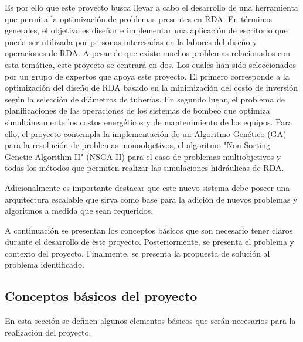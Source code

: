 \documentclass[11pt,letterpaper]{article}
\begin{document}
Es por ello que este proyecto busca llevar a cabo el desarrollo de una herramienta que permita la optimización de problemas presentes en RDA. En términos generales, el objetivo es diseñar e implementar una aplicación de escritorio que pueda ser utilizada por personas interesadas en la labores del diseño y operaciones de RDA. A pesar de que existe muchos problemas relacionados con esta temática, este proyecto se centrará en dos. Los cuales han sido seleccionados por un grupo de expertos que apoya este proyecto. El primero corresponde a la optimización del diseño de RDA basado en la minimización del costo de inversión según la selección de diámetros de tuberías. En segundo lugar, el problema de planificaciones de las operaciones de los sistemas de bombeo que optimiza simultáneamente los costos energéticos y de mantenimiento de los equipos. Para ello, el proyecto contempla la implementación de un Algoritmo Genético (GA) para la resolución de problemas monoobjetivos, el algoritmo  "Non Sorting Genetic Algorithm II" (NSGA-II) para el caso de problemas multiobjetivos y todas los métodos que permiten realizar las simulaciones hidráulicas de RDA.

Adicionalmente es importante destacar que este nuevo sistema debe poseer una arquitectura escalable que sirva como base para la adición de nuevos problemas y algoritmos a medida que sean requeridos.

A continuación se presentan los conceptos básicos que son necesario tener claros durante el desarrollo de este proyecto. Posteriormente, se presenta el problema y contexto del proyecto. Finalmente, se presenta la propuesta de solución al problema identificado.

\subsection{Conceptos básicos del proyecto} 

En esta sección se definen algunos elementos básicos que serán necesarios para la realización del proyecto.
\end{document}

